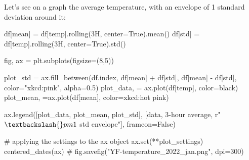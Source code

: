\documentclass[
  letterpaper,
  DIV=11,
  numbers=noendperiod,
  oneside]{scrreprt}
\newenvironment{Shaded}{\begin{snugshade}}{\end{snugshade}}
\newcommand{\BuiltInTok}[1]{\textcolor[rgb]{0.00,0.23,0.31}{#1}}
\newcommand{\CommentTok}[1]{\textcolor[rgb]{0.37,0.37,0.37}{#1}}
\newcommand{\DecValTok}[1]{\textcolor[rgb]{0.68,0.00,0.00}{#1}}
\newcommand{\FloatTok}[1]{\textcolor[rgb]{0.68,0.00,0.00}{#1}}
\newcommand{\NormalTok}[1]{\textcolor[rgb]{0.00,0.23,0.31}{#1}}
\newcommand{\OperatorTok}[1]{\textcolor[rgb]{0.37,0.37,0.37}{#1}}
\newcommand{\StringTok}[1]{\textcolor[rgb]{0.13,0.47,0.30}{#1}}
\newcommand{\VariableTok}[1]{\textcolor[rgb]{0.07,0.07,0.07}{#1}}
\newcommand{\VerbatimStringTok}[1]{\textcolor[rgb]{0.13,0.47,0.30}{#1}}
\begin{document}
Let's see on a graph the average temperature, with an envelope of 1
standard deviation around it:

\begin{Shaded}
\begin{Highlighting}[]
\NormalTok{df[}\StringTok{\textquotesingle{}mean\textquotesingle{}}\NormalTok{] }\OperatorTok{=}\NormalTok{ df[}\StringTok{\textquotesingle{}temp\textquotesingle{}}\NormalTok{].rolling(}\StringTok{\textquotesingle{}3H\textquotesingle{}}\NormalTok{, center}\OperatorTok{=}\VariableTok{True}\NormalTok{).mean()}
\NormalTok{df[}\StringTok{\textquotesingle{}std\textquotesingle{}}\NormalTok{] }\OperatorTok{=}\NormalTok{ df[}\StringTok{\textquotesingle{}temp\textquotesingle{}}\NormalTok{].rolling(}\StringTok{\textquotesingle{}3H\textquotesingle{}}\NormalTok{, center}\OperatorTok{=}\VariableTok{True}\NormalTok{).std()}
\end{Highlighting}
\end{Shaded}

\begin{Shaded}
\begin{Highlighting}[]
\NormalTok{fig, ax }\OperatorTok{=}\NormalTok{ plt.subplots(figsize}\OperatorTok{=}\NormalTok{(}\DecValTok{8}\NormalTok{,}\DecValTok{5}\NormalTok{))}


\NormalTok{plot\_std }\OperatorTok{=}\NormalTok{ ax.fill\_between(df.index,}
\NormalTok{                            df[}\StringTok{\textquotesingle{}mean\textquotesingle{}}\NormalTok{] }\OperatorTok{+}\NormalTok{ df[}\StringTok{\textquotesingle{}std\textquotesingle{}}\NormalTok{],}
\NormalTok{                            df[}\StringTok{\textquotesingle{}mean\textquotesingle{}}\NormalTok{] }\OperatorTok{{-}}\NormalTok{ df[}\StringTok{\textquotesingle{}std\textquotesingle{}}\NormalTok{],}
\NormalTok{                            color}\OperatorTok{=}\StringTok{"xkcd:pink"}\NormalTok{, alpha}\OperatorTok{=}\FloatTok{0.5}\NormalTok{)}
\NormalTok{plot\_data, }\OperatorTok{=}\NormalTok{ ax.plot(df[}\StringTok{\textquotesingle{}temp\textquotesingle{}}\NormalTok{], color}\OperatorTok{=}\StringTok{\textquotesingle{}black\textquotesingle{}}\NormalTok{)}
\NormalTok{plot\_mean, }\OperatorTok{=}\NormalTok{ax.plot(df[}\StringTok{\textquotesingle{}mean\textquotesingle{}}\NormalTok{], color}\OperatorTok{=}\StringTok{\textquotesingle{}xkcd:hot pink\textquotesingle{}}\NormalTok{)}

\NormalTok{ax.legend([plot\_data, plot\_mean, plot\_std],}
\NormalTok{          [}\StringTok{\textquotesingle{}data\textquotesingle{}}\NormalTok{, }\StringTok{\textquotesingle{}3{-}hour average\textquotesingle{}}\NormalTok{, }\VerbatimStringTok{r"$\textbackslash{}pm1$ std envelope"}\NormalTok{],}
\NormalTok{          frameon}\OperatorTok{=}\VariableTok{False}\NormalTok{)}

\CommentTok{\# applying the settings to the ax object}
\NormalTok{ax.}\BuiltInTok{set}\NormalTok{(}\OperatorTok{**}\NormalTok{plot\_settings)}
\NormalTok{centered\_dates(ax)}
\CommentTok{\# fig.savefig("YF{-}temperature\_2022\_jan.png", dpi=300)}
\end{Highlighting}
\end{Shaded}
\end{document}
